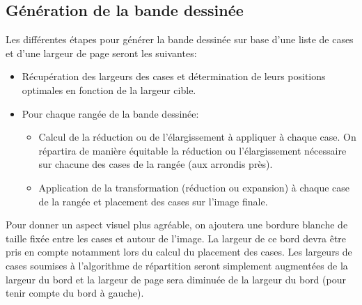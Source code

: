 \documentclass[a4paper,10pt]{article}
\begin{document}

\subsection{Génération de la bande dessinée}\label{sec:packing}

Les différentes étapes pour générer la bande dessinée sur base d'une
liste de cases et d'une largeur de page seront les suivantes:
\begin{itemize}
\item Récupération des largeurs des cases et détermination de leurs
  positions optimales en fonction de la largeur cible.
\item Pour chaque rangée de la bande dessinée:
\begin{itemize}
\item Calcul de la réduction ou de l'élargissement à appliquer à
  chaque case. On répartira de manière équitable la réduction ou
  l'élargissement nécessaire sur chacune des cases de la rangée (aux
  arrondis près).
\item Application de la transformation (réduction ou expansion) à
  chaque case de la rangée et placement des cases sur l'image finale.
\end{itemize}
\end{itemize}

Pour donner un aspect visuel plus agréable, on ajoutera une bordure
blanche de taille fixée entre les cases et autour de l'image. La
largeur de ce bord devra être pris en compte notamment lors du calcul
du placement des cases. Les largeurs de cases soumises à l'algorithme
de répartition seront simplement augmentées de la largeur du bord et
la largeur de page sera diminuée de la largeur du bord (pour tenir
compte du bord à gauche).
\end{document}
